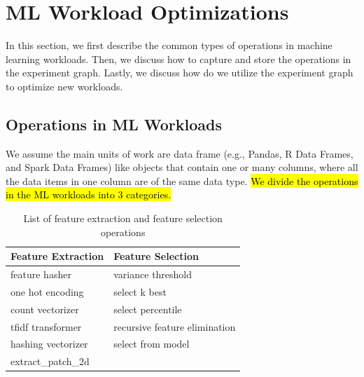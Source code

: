 \section{ML Workload Optimizations} \label{sec-ml-workloads}
In this section, we first describe the common types of operations in machine learning workloads.
Then, we discuss how to capture and store the operations in the experiment graph.
Lastly, we discuss how do we utilize the experiment graph to optimize new workloads.

\subsection{Operations in ML Workloads}
We assume the main units of work are data frame (e.g., Pandas, R Data Frames, and Spark Data Frames) like objects that contain one or many columns, where all the data items in one column are of the same data type.
\hl{We divide the operations in the ML workloads into 3 categories.}
\begin{table}
\centering
\begin{tabular}{ll}
\hline
	   Feature Extraction & Feature Selection\\ \hline
        feature hasher & variance threshold  \\
        one hot encoding & select k best \\
        count vectorizer& select percentile \\ 
        tfidf transformer & recursive feature elimination \\
        hashing vectorizer & select from model \\
        extract\_patch\_2d &  \\
        \hline
\end{tabular}
\caption{List of feature extraction and feature selection operations}\label{feature-engineering-operations}
\end{table}

